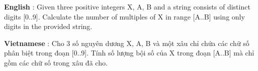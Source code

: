 \textbf{    English   }   : Given three positive integers X, A, B and a string consists of distinct digits [0..9]. Calculate the number of multiples of X in range [A..B] using only digits in the provided string.  

\textbf{    Vietnamese   }   : Cho 3 số nguyên dương X, A, B và một xâu chỉ chứa các chữ số phân biệt trong đoạn [0..9]. Tính số lượng bội số của X trong đoạn [A..B] mà chỉ gồm các chữ số trong xâu đã cho.  

\